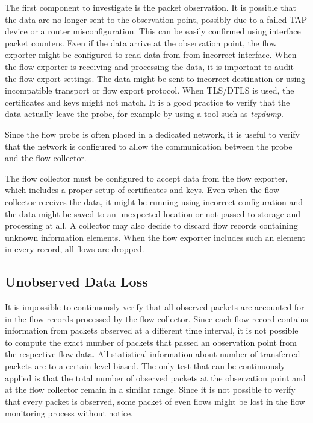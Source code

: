 The first component to investigate is the packet observation. It is possible that the data are no longer sent to the observation point, possibly due to a failed TAP device or a router misconfiguration. This can be easily confirmed using interface packet counters. Even if the data arrive at the observation point, the flow exporter might be configured to read data from from incorrect interface. When the flow exporter is receiving and processing the data, it is important to audit the flow export settings. The data might be sent to incorrect destination or using incompatible transport or flow export protocol. When TLS/DTLS is used, the certificates and keys might not match. It is a good practice to verify that the data actually leave the probe, for example by using a tool such as \emph{tcpdump}.

Since the flow probe is often placed in a dedicated network, it is useful to verify that the network is configured to allow the communication between the probe and the flow collector.

The flow collector must be configured to accept data from the flow exporter, which includes a proper setup of certificates and keys. Even when the flow collector receives the data, it might be running using incorrect configuration and the data might be saved to an unexpected location or not passed to storage and processing at all. A collector may also decide to discard flow records containing unknown information elements. When the flow exporter includes such an element in every record, all flows are dropped. 

\subsection{Unobserved Data Loss}

It is impossible to continuously verify that all observed packets are accounted for in the flow records processed by the flow collector. Since each flow record contains information from packets observed at a different time interval, it is not possible to compute the exact number of packets that passed an observation point from the respective flow data. All statistical information about number of transferred packets are to a certain level biased. The only test that can be continuously applied is that the total number of observed packets at the observation point and at the flow collector remain in a similar range. Since it is not possible to verify that every packet is observed, some packet of even flows might be lost in the flow monitoring process without notice.

